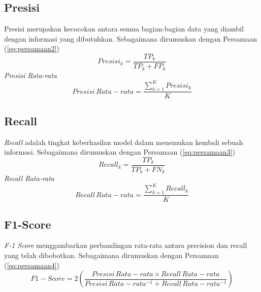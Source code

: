 \subsection{Presisi}
Presisi merupakan kecocokan antara semua bagian-bagian data yang diambil dengan informasi yang dibutuhkan. Sebagaimana dirumuskan dengan Persamaan (\ref{eq:persamaan2})
\begin{equation}\label{eq:persamaan2}
Presisi_k=\frac{TP_k}{TP_k+FP_k}
\end{equation} 
{\it Presisi Rata-rata}
\begin{equation}\label{eq:persamaan3}
Presisi \, Rata-rata=\frac{\sum_{k=1}^K Presisi_k}{K}
\end{equation} 
\subsection{Recall}
\textit{Recall} adalah tingkat keberhasilan model dalam menemukan
kembali sebuah informasi. Sebagaimana dirumuskan dengan Persamaan (\ref{eq:persamaan3})
\begin{equation}\label{eq:persamaan4}
Recall_k=\frac{TP_k}{TP_k+FN_k}
\end{equation} 
{\it Recall Rata-rata}
\begin{equation}\label{eq:persamaan5}
Recall \, Rata-rata=\frac{\sum_{k=1}^K Recall_k}{K}
\end{equation} 
\subsection{F1-Score}
\textit{F-1 Score} menggambarkan perbandingan rata-rata antara precision dan recall yang telah dibobotkan. Sebagaimana dirumuskan dengan Persamaan (\ref{eq:persamaan4})
\begin{equation}\label{eq:persamaan6}
F1-Score=2 \left( \frac{Presisi \, Rata-rata \times Recall \, Rata-rata}{Presisi \, Rata-rata^{-1} + Recall \, Rata-rata^{-1}} \right)
\end{equation} 


